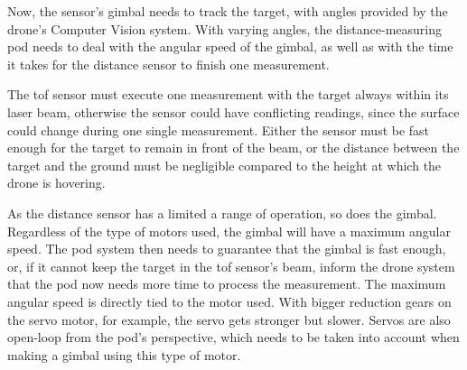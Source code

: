 Now, the sensor's gimbal needs to track the target, with angles provided by the drone's
Computer Vision system. With varying angles, the distance-measuring pod needs
to deal with the angular speed of the gimbal, as well as with the time it takes for the
distance sensor to finish one measurement.

The \gls{tof} sensor must execute one measurement with the target always within its
laser beam, otherwise the sensor could have conflicting readings, since the surface could
change during one single measurement. Either the sensor must be fast enough for the target
to remain in front of the beam, or the distance between the target and the ground must be
negligible compared to the height at which the drone is hovering.

As the distance sensor has a limited a range of operation, so does the gimbal. Regardless
of the type of motors used, the gimbal will have a maximum angular speed. The pod system
then needs to guarantee that the gimbal is fast enough, or, if it cannot keep the target
in the \gls{tof} sensor's beam, inform the drone system that
the pod now needs more time to process the measurement. The maximum angular speed is
directly
tied to the motor used. With bigger reduction gears on the servo motor, for example,
the servo gets stronger but slower. Servos are also open-loop from the pod's perspective,
 which needs to be taken into account when making a gimbal using this type of motor.
